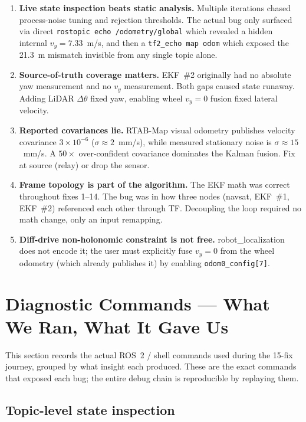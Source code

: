 \documentclass[11pt,a4paper]{article}
\begin{document}
\begin{enumerate}
\item \textbf{Live state inspection beats static analysis.} Multiple iterations chased
process-noise tuning and rejection thresholds. The actual bug only surfaced via direct
\texttt{rostopic echo /odometry/global} which revealed a hidden internal $v_y\!=\!7.33$~m/s, and
then a \texttt{tf2\_echo map odom} which exposed the 21.3~m mismatch invisible from any single
topic alone.

\item \textbf{Source-of-truth coverage matters.} EKF~\#2 originally had no absolute yaw measurement
and no $v_y$ measurement. Both gaps caused state runaway. Adding LiDAR $\Delta\theta$ fixed yaw,
enabling wheel $v_y\!=\!0$ fusion fixed lateral velocity.

\item \textbf{Reported covariances lie.} RTAB-Map visual odometry publishes velocity covariance
$3\!\times\!10^{-6}$ ($\sigma\!\approx\!2$~mm/s), while measured stationary noise is $\sigma\!\approx\!15$~mm/s.
A $50\!\times$ over-confident covariance dominates the Kalman fusion. Fix at source (relay) or drop the
sensor.

\item \textbf{Frame topology is part of the algorithm.} The EKF math was correct throughout fixes 1--14.
The bug was in how three nodes (navsat, EKF~\#1, EKF~\#2) referenced each other through TF.
Decoupling the loop required no math change, only an input remapping.

\item \textbf{Diff-drive non-holonomic constraint is not free.}
robot\_localization does not encode it; the user must explicitly fuse $v_y\!=\!0$ from the
wheel odometry (which already publishes it) by enabling \texttt{odom0\_config[7]}.
\end{enumerate}

\section{Diagnostic Commands --- What We Ran, What It Gave Us}

This section records the actual ROS~2 / shell commands used during the 15-fix journey,
grouped by what insight each produced. These are the exact commands that exposed each
bug; the entire debug chain is reproducible by replaying them.

\subsection{Topic-level state inspection}
\end{document}

